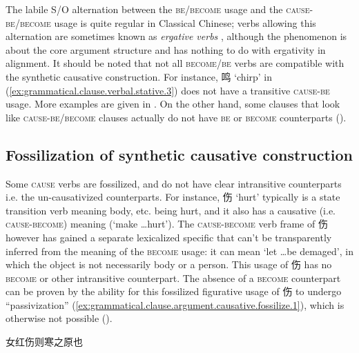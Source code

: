 \documentclass[UTF8, a4paper, oneside, scheme=plain, 12pt]{ctexrep}
\newcommand*{\citepage}[1]{p.~{#1}}
\newcommand*{\term}[1]{\emph{#1}}
\newcommand{\translate}[1]{`#1'}
\newcommand*{\category}[1]{\textsc{#1}}
\begin{document}
The labile S/O alternation between the \category{be}/\category{become} usage
and the \category{cause}-\category{be}/\category{become} usage
is quite regular in Classical Chinese;
verbs allowing this alternation are sometimes known as \term{ergative verbs}
\citep[\citepage{378}]{meiguang2018},
although the phenomenon is about the core argument structure and has nothing to do with ergativity in alignment.
It should be noted that not all \category{become}/\category{be} verbs are compatible
with the synthetic causative construction.
For instance, 鸣 \translate{chirp} in (\ref{ex:grammatical.clause.verbal.stative.3})
does not have a transitive \category{cause}-\category{be} usage.
More examples are given in \citet[\citepage{276}]{meiguang2018}.
On the other hand, some clauses that look like \category{cause}-\category{be}/\category{become} clauses
actually do not have \category{be} or \category{become} counterparts 
().

\subsection{Fossilization of synthetic causative construction}
\label{sec:grammatical.clause.verbal.argument-structure.causative.fossilization}

Some \category{cause} verbs are fossilized,
and do not have clear intransitive counterparts
i.e. the un-causativized counterparts.
For instance, 伤 \translate{hurt} typically is a state transition verb meaning body, etc. being hurt,
and it also has a causative (i.e. \category{cause}-\category{become}) meaning
(\translate{make \dots hurt}).
The \category{cause}-\category{become} verb frame of 伤 however has gained a separate lexicalized specific that can't be transparently inferred from the meaning of the \category{become} usage:
it can mean \translate{let \dots be demaged},
in which the object is not necessarily body or a person.
This usage of 伤 has no \category{become} or other intransitive counterpart.
The absence of a \category{become} counterpart can be proven by 
the ability for this fossilized figurative usage of 伤 to undergo ``passivization'' 
(\ref{ex:grammatical.clause.argument.causative.fossilize.1}),
which is otherwise not possible ().

\begin{exe}
    \ex\label{ex:grammatical.clause.argument.causative.fossilize.1} 女红伤则寒之原也
\end{exe}
\end{document}
